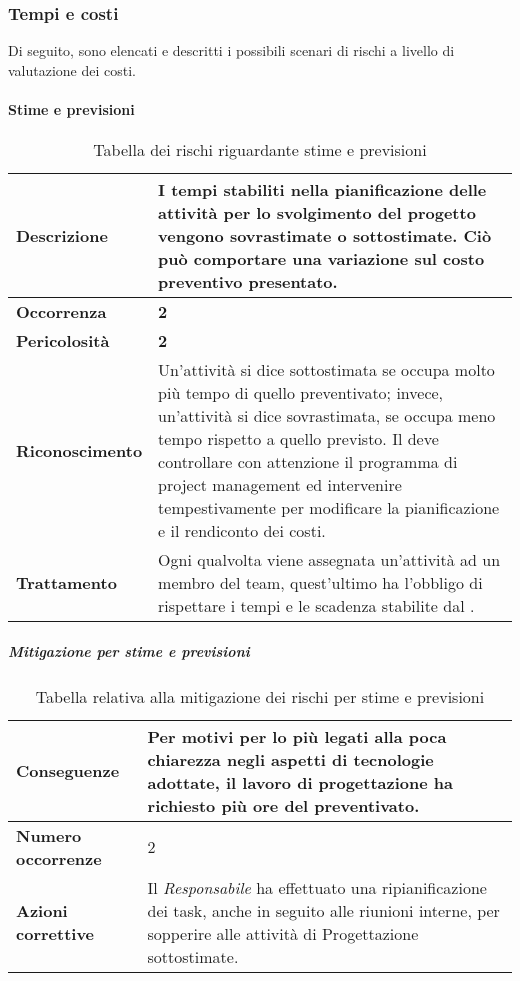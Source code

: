 \subsubsection{Tempi e costi}

Di seguito, sono elencati e descritti i possibili scenari di rischi a livello di valutazione dei costi.

\paragraph{Stime e previsioni}

\begin{table}[H]
	\begin{center}
		\begin{tabular}{|l | p{11cm}|}
			\hline
			\textbf{Descrizione}	& I tempi stabiliti nella pianificazione delle attività per lo svolgimento del progetto vengono sovrastimate o sottostimate. Ciò può comportare una variazione sul costo preventivo presentato. \\
			\hline
			\textbf{Occorrenza}	&	\textbf{2}	\\
			\hline
			\textbf{Pericolosità}	&	\textbf{2}	\\
			\hline
			\textbf{Riconoscimento}	& Un’attività si dice sottostimata se occupa molto più tempo di quello preventivato; invece, un'attività si dice sovrastimata, se occupa meno tempo rispetto a quello previsto. Il \textit{\RdP} deve controllare con attenzione il programma di project management ed intervenire tempestivamente per modificare la pianificazione e il rendiconto dei costi.	\\
			\hline
			\textbf{Trattamento}	&	Ogni qualvolta viene assegnata un'attività ad un membro del team, quest'ultimo ha l'obbligo di rispettare i tempi e le scadenza stabilite dal \textit{\RdP}.	\\
			\hline
		\end{tabular}
		\caption{Tabella dei rischi riguardante stime e previsioni}
	\end{center}
\end{table}

\subparagraph{Mitigazione per stime e previsioni}

\begin{table}[H]
	\begin{center}
		\begin{tabular}{|l | p{11cm}|}
			\hline
			\textbf{Conseguenze}	& Per motivi per lo più legati alla poca chiarezza negli aspetti di tecnologie
			adottate, il lavoro di progettazione ha richiesto più ore del preventivato. \\
			\hline
			\textbf{Numero occorrenze} & 2 \\
			\hline
			\textbf{Azioni correttive}	&	Il \textit{Responsabile} ha effettuato una ripianificazione dei task, anche in seguito alle riunioni interne, per sopperire alle attività di Progettazione sottostimate.\\
			\hline
		\end{tabular}
		\caption{Tabella relativa alla mitigazione dei rischi per stime e previsioni}
	\end{center}
\end{table}


